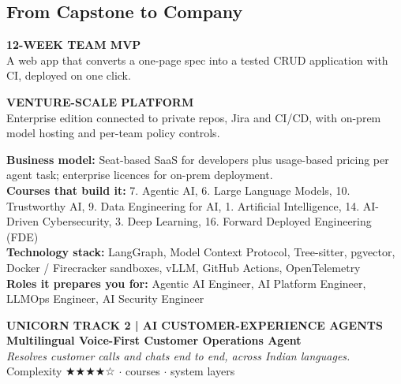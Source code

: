 \documentclass[10pt,a4paper]{article}
\begin{document}
\subsection*{From Capstone to Company}
\begin{tcbraster}[raster columns=2,raster equal height,raster column skip=8pt]\begin{tcolorbox}[colback=l1bg,colframe=l1bg,arc=2pt,borderline north={2.5pt}{0pt}{saffron}]{\scriptsize\bfseries\color{muted}12-WEEK TEAM MVP}\\\small A web app that converts a one-page spec into a tested CRUD application with CI, deployed on one click.\end{tcolorbox}\begin{tcolorbox}[colback=l3bg,colframe=l3bg,arc=2pt,borderline north={2.5pt}{0pt}{igreen}]{\scriptsize\bfseries\color{muted}VENTURE-SCALE PLATFORM}\\\small Enterprise edition connected to private repos, Jira and CI/CD, with on-prem model hosting and per-team policy controls.\end{tcolorbox}\end{tcbraster}
{\small\textbf{Business model:} Seat-based SaaS for developers plus usage-based pricing per agent task; enterprise licences for on-prem deployment.\\\textbf{Courses that build it:} 7. Agentic AI, 6. Large Language Models, 10. Trustworthy AI, 9. Data Engineering for AI, 1. Artificial Intelligence, 14. AI-Driven Cybersecurity, 3. Deep Learning, 16. Forward Deployed Engineering (FDE)\\\textbf{Technology stack:} LangGraph, Model Context Protocol, Tree-sitter, pgvector, Docker / Firecracker sandboxes, vLLM, GitHub Actions, OpenTelemetry\\\textbf{Roles it prepares you for:} Agentic AI Engineer, AI Platform Engineer, LLMOps Engineer, AI Security Engineer}
\newpage
\begin{tcolorbox}[colback=navy,colframe=navy,arc=2pt,left=8pt,top=5pt,bottom=5pt]{\small\bfseries\color{goldl}UNICORN TRACK 2 \;|\; AI CUSTOMER-EXPERIENCE AGENTS}\\[1pt]{\LARGE\bfseries\color{white}Multilingual Voice-First Customer Operations Agent}\\[2pt]{\small\itshape\color{goldl}Resolves customer calls and chats end to end, across Indian languages.}\\[2pt]{\small\color{white}Complexity {\color{goldl}★★★★☆} \;$\cdot$ courses \;$\cdot$ system layers}\end{tcolorbox}
\end{document}

